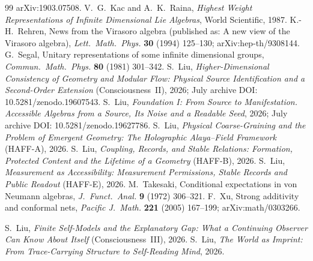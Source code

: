 \documentclass[12pt]{article}
\theoremstyle{definition}
\theoremstyle{remark}
\begin{document}
\begin{thebibliography}{99}
arXiv:1903.07508.
 V.~G.~Kac and A.~K.~Raina, \emph{Highest Weight Representations of Infinite Dimensional Lie Algebras}, World Scientific, 1987.
 K.-H.~Rehren, News from the Virasoro algebra (published as: A new view of
the Virasoro algebra), \emph{Lett.\ Math.\ Phys.} \textbf{30} (1994) 125--130;
arXiv:hep-th/9308144.
 G.~Segal, Unitary representations of some infinite dimensional groups, \emph{Commun.\ Math.\ Phys.} \textbf{80} (1981) 301--342.
 S.~Liu, \emph{Higher-Dimensional Consistency of Geometry and Modular Flow: Physical Source Identification and a Second-Order Extension} (Consciousness~II), 2026;
July archive DOI: 10.5281/zenodo.19607543.
 S.~Liu, \emph{Foundation I: From Source to Manifestation.
Accessible Algebras from a Source, Its Noise and a Readable Seed},
2026; July archive DOI: 10.5281/zenodo.19627786.
 S.~Liu, \emph{Physical Coarse-Graining and the Problem of Emergent Geometry:
The Holographic Alaya--Field Framework} (HAFF-A), 2026.
 S.~Liu, \emph{Coupling, Records, and Stable Relations:
Formation, Protected Content and the Lifetime of a Geometry} (HAFF-B),
2026.
 S.~Liu, \emph{Measurement as Accessibility:
Measurement Permissions, Stable Records and Public Readout} (HAFF-E),
2026.
 M.~Takesaki, Conditional expectations in von Neumann algebras, \emph{J.\ Funct.\ Anal.} \textbf{9} (1972) 306--321.
 F.~Xu, Strong additivity and conformal nets, \emph{Pacific J.\ Math.}
\textbf{221} (2005) 167--199; arXiv:math/0303266.

 S.~Liu, \emph{Finite Self-Models and the Explanatory Gap:
What a Continuing Observer Can Know About Itself}
(Consciousness~III), 2026.
 S.~Liu, \emph{The World as Imprint:
From Trace-Carrying Structure to Self-Reading Mind}, 2026.

\end{thebibliography}
\end{document}
